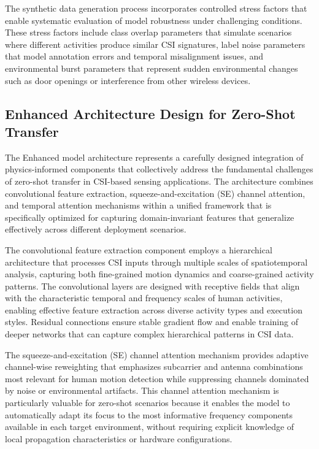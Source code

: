 \documentclass[journal]{IEEEtran}
\begin{document}
The synthetic data generation process incorporates controlled stress factors that enable systematic evaluation of model robustness under challenging conditions. These stress factors include class overlap parameters that simulate scenarios where different activities produce similar CSI signatures, label noise parameters that model annotation errors and temporal misalignment issues, and environmental burst parameters that represent sudden environmental changes such as door openings or interference from other wireless devices.

\subsection{Enhanced Architecture Design for Zero-Shot Transfer}

The Enhanced model architecture represents a carefully designed integration of physics-informed components that collectively address the fundamental challenges of zero-shot transfer in CSI-based sensing applications. The architecture combines convolutional feature extraction, squeeze-and-excitation (SE) channel attention, and temporal attention mechanisms within a unified framework that is specifically optimized for capturing domain-invariant features that generalize effectively across different deployment scenarios.

The convolutional feature extraction component employs a hierarchical architecture that processes CSI inputs through multiple scales of spatiotemporal analysis, capturing both fine-grained motion dynamics and coarse-grained activity patterns. The convolutional layers are designed with receptive fields that align with the characteristic temporal and frequency scales of human activities, enabling effective feature extraction across diverse activity types and execution styles. Residual connections ensure stable gradient flow and enable training of deeper networks that can capture complex hierarchical patterns in CSI data.

The squeeze-and-excitation (SE) channel attention mechanism provides adaptive channel-wise reweighting that emphasizes subcarrier and antenna combinations most relevant for human motion detection while suppressing channels dominated by noise or environmental artifacts. This channel attention mechanism is particularly valuable for zero-shot scenarios because it enables the model to automatically adapt its focus to the most informative frequency components available in each target environment, without requiring explicit knowledge of local propagation characteristics or hardware configurations.
\end{document}
